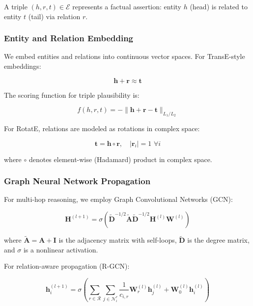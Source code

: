 \documentclass[conference]{IEEEtran}
\begin{document}
A triple $(h, r, t) \in \mathcal{E}$ represents a factual assertion: entity $h$ (head) is related to entity $t$ (tail) via relation $r$.

\subsubsection{Entity and Relation Embedding}

We embed entities and relations into continuous vector spaces. For TransE-style embeddings:

\begin{equation}
\mathbf{h} + \mathbf{r} \approx \mathbf{t}
\end{equation}

The scoring function for triple plausibility is:

\begin{equation}
f(h, r, t) = -\|\mathbf{h} + \mathbf{r} - \mathbf{t}\|_{L_1/L_2}
\end{equation}

For RotatE, relations are modeled as rotations in complex space:

\begin{equation}
\mathbf{t} = \mathbf{h} \circ \mathbf{r}, \quad |\mathbf{r}_i| = 1 \,\,\forall i
\end{equation}

where $\circ$ denotes element-wise (Hadamard) product in complex space.

\subsubsection{Graph Neural Network Propagation}

For multi-hop reasoning, we employ Graph Convolutional Networks (GCN):

\begin{equation}
\mathbf{H}^{(l+1)} = \sigma\left(\tilde{\mathbf{D}}^{-1/2} \tilde{\mathbf{A}} \tilde{\mathbf{D}}^{-1/2} \mathbf{H}^{(l)} \mathbf{W}^{(l)}\right)
\end{equation}

where $\tilde{\mathbf{A}} = \mathbf{A} + \mathbf{I}$ is the adjacency matrix with self-loops, $\tilde{\mathbf{D}}$ is the degree matrix, and $\sigma$ is a nonlinear activation.

For relation-aware propagation (R-GCN):

\begin{equation}
\mathbf{h}_i^{(l+1)} = \sigma\left(\sum_{r \in \mathcal{R}} \sum_{j \in \mathcal{N}_i^r} \frac{1}{c_{i,r}} \mathbf{W}_r^{(l)} \mathbf{h}_j^{(l)} + \mathbf{W}_0^{(l)} \mathbf{h}_i^{(l)}\right)
\end{equation}
\end{document}
